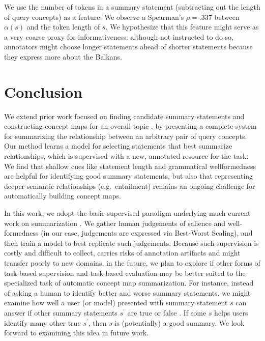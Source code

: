 \documentclass[11pt,a4paper]{article}
\begin{document}
We use the number of tokens in a summary statement (subtracting out the length of query concepts) as a feature. We observe a Spearman's $\rho=.337$ between $\alpha(s)$ and the token length of $s$.  We hypothesize that this feature might serve as a very coarse proxy for informativeness: although not instructed to do so, annotators might choose longer statements ahead of shorter statements because they express more about the Balkans.

\section{Conclusion}\label{s:conclusion}

We extend prior work focused on finding candidate summary statements \cite{N18-1159} and constructing concept maps for an overall topic \cite{emnlp2017conceptmaps}, by presenting a complete system for summarizing the relationship between an arbitrary pair of query concepts. Our method learns a model for selecting statements that best summarize relationships, which is supervised with a new, annotated resource for the task. We find that shallow cues like statement length and grammatical wellformedness are helpful for identifying good summary statements, but also that representing deeper semantic relationships (e.g.\ entailment) remains an ongoing challenge for automatically building concept maps. 

In this work, we adopt the basic supervised paradigm underlying much current work on summarization \cite{Hermann2015TeachingMT,N18-1065}. We gather human judgements of salience and well-formedness (in our case, judgements are expressed via Best-Worst Scaling), and then train a model to best replicate such judgements. Because such supervision is costly and difficult to collect, carries risks of annotation artifacts \cite{N18-2017} and might transfer poorly to new domains, in the future, we plan to explore if other forms of task-based supervision and task-based evaluation \cite{Jing1998SummarizationEM} may be better suited to the specialized task of automatic concept map summarization. For instance, instead of asking a human to identify better and worse summary statements, we might examine how well a user (or model) presented with summary statement $s$ can answer if other summary statements $s^\prime$ are true or false \cite{eyal-etal-2019-question}. If some $s$ helps users identify many other true $s^{\prime}$, then $s$ is (potentially) a good summary. We look forward to examining this idea in future work.
\end{document}
